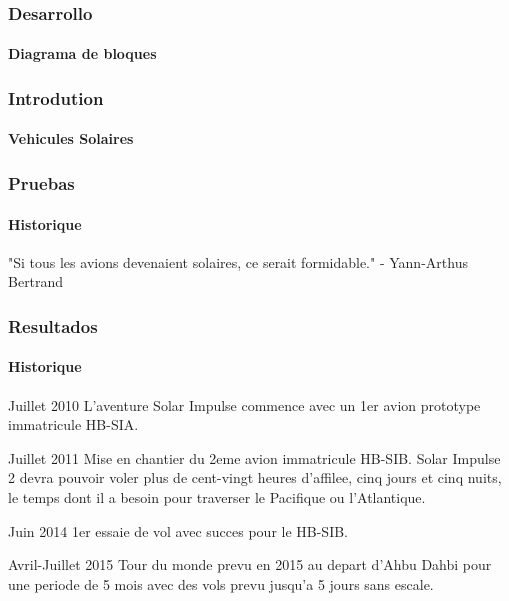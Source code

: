 \documentclass{beamer}
\begin{document}
\begin{frame}
\frametitle{Desarrollo}
\framesubtitle{Diagrama de bloques}
\centering
 {
  
 }

\end{frame}

\begin{frame}
\frametitle{Introdution}
\framesubtitle{Vehicules Solaires}

\end{frame}


\begin{frame}
\frametitle{Pruebas}
\framesubtitle{Historique}
"Si tous les avions devenaient solaires, ce serait formidable." - Yann-Arthus Bertrand

\begin{figure}
\end{figure}

\end{frame}



\begin{frame}
\frametitle{Resultados}
\framesubtitle{Historique}
\begin{block}{Juillet 2010}
L'aventure Solar Impulse commence avec un 1er avion prototype immatricule HB-SIA. 
\end{block}

\begin{block}{Juillet 2011}
Mise en chantier du 2eme avion immatricule HB-SIB. Solar Impulse 2 devra pouvoir voler plus de cent-vingt heures d'affilee, cinq jours et cinq nuits, le temps dont il a besoin pour traverser le Pacifique ou l'Atlantique.
\end{block}

\begin{block}{Juin 2014}
1er essaie de vol avec succes pour le HB-SIB.
\end{block}


\begin{block}{Avril-Juillet 2015}
Tour du monde prevu en 2015 au depart d'Ahbu Dahbi pour une periode de 5 mois avec des vols prevu jusqu'a 5 jours sans escale. 
\end{block}

\end{frame}
\end{document}

